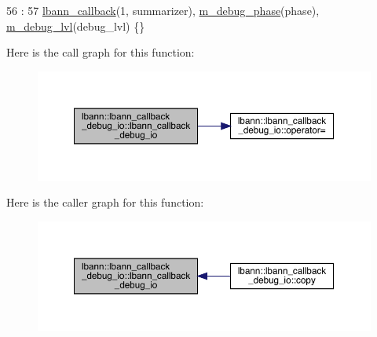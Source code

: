 \begin{DoxyCode}
56                                                                :
57     \hyperlink{classlbann_1_1lbann__callback_a679057298a41ddd47f08c157f756c584}{lbann\_callback}(1, summarizer), \hyperlink{classlbann_1_1lbann__callback__debug__io_add73fbc786ca9284fa3399a7e99d0b1f}{m\_debug\_phase}(phase), 
      \hyperlink{classlbann_1_1lbann__callback__debug__io_adfd537a09e80aaa0887e5226dc52c13c}{m\_debug\_lvl}(debug\_lvl) \{\}
\end{DoxyCode}
Here is the call graph for this function\+:\nopagebreak
\begin{figure}[H]
\begin{center}
\leavevmode
\includegraphics[width=350pt]{classlbann_1_1lbann__callback__debug__io_a4103f7a133e2e7a8afe8744fc9345e2c_cgraph}
\end{center}
\end{figure}
Here is the caller graph for this function\+:\nopagebreak
\begin{figure}[H]
\begin{center}
\leavevmode
\includegraphics[width=350pt]{classlbann_1_1lbann__callback__debug__io_a4103f7a133e2e7a8afe8744fc9345e2c_icgraph}
\end{center}
\end{figure}
\mbox{\label{classlbann_1_1lbann__callback__debug__io_ae3b6fceef4e765ce66527b2a44ae8f3a}} 
